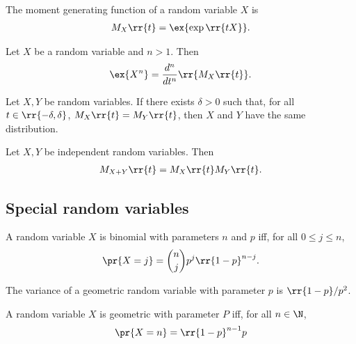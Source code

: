 \documentclass{article}
\begin{document}
\begin{definition}\label{def:moment-generating-function}
  The moment generating function of a random variable $X$ is
  \begin{align*}
    M_X\rr{t}=\ex{\exp\rr{tX}}.
  \end{align*}
\end{definition}

\begin{theorem}
  Let $X$ be a random variable and $n>1$. Then
  \begin{align*}
    \ex{X^n}=\frac{d^n}{dt^n}\rr{M_X\rr{t}}.
  \end{align*}
\end{theorem}

\begin{theorem}
  Let $X,Y$ be random variables. If there exists $\delta>0$ such that, for all $t\in\rr{-\delta,\delta}$,
  $M_X\rr{t}=M_Y\rr{t}$, then $X$ and $Y$ have the same distribution.
\end{theorem}

\begin{theorem}
  Let $X,Y$ be independent random variables. Then
  \begin{align*}
    M_{X+Y}\rr{t}=M_X\rr{t}M_Y\rr{t}.
  \end{align*}
\end{theorem}

\subsection{Special random variables}

\begin{definition}
  \label{def:binomial}
  A random variable $X$ is binomial with parameters $n$ and $p$ iff,
  for all $0\leq j\leq n$,
  \begin{align*}
    \pr{X=j}=\binom{n}{j}p^j \rr{1-p}^{n-j}.
  \end{align*}
\end{definition}

\begin{lemma}
  The variance of a geometric random variable with parameter $p$ is $\rr{1-p}/p^2$.
\end{lemma}

\begin{definition}
  \label{def:geometric}
  A random variable $X$ is geometric with parameter $P$ iff, for all $n\in\N$,
  \begin{align*}
    \pr{X=n}=\rr{1-p}^{n-1} p
  \end{align*}
\end{definition}
\end{document}
